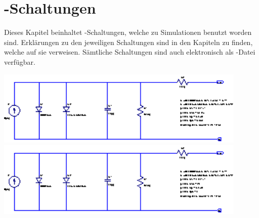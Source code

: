 \chapter{-Schaltungen}
\label{app:ltspice}

Dieses Kapitel  beinhaltet -Schaltungen, welche  zu Simulationen
benutzt worden sind. Erkl\"arungen  zu den jeweiligen Schaltungen  sind in den
Kapiteln  zu finden,  welche auf  sie verweisen. S\"amtliche  Schaltungen sind
auch elektronisch als -Datei verf\"ugbar.

\noindent\begin{minipage}{\textwidth}
    \centering
    \includegraphics[width=0.9\textwidth]{images/ltspice/jac/cell.eps}
    \label{fig:ltspice:jac:cell}
    \centering
    \includegraphics[width=0.9\textwidth]{images/ltspice/generic-iv-curves/cell.eps}
    \label{fig:ltspice:iv:generic:cell}
\end{minipage}


